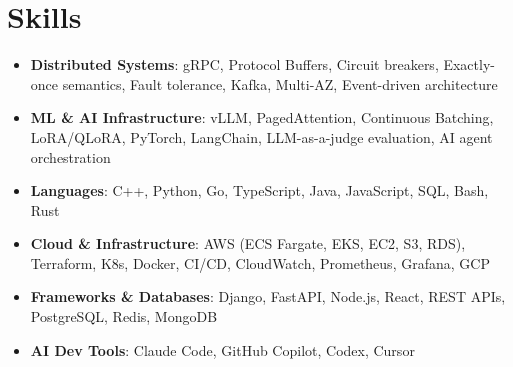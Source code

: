 \documentclass[letterpaper,11pt]{article}
\newcommand{\resumeSubHeadingListStart}{\begin{itemize}[leftmargin=0.15in, label={}]}
\newcommand{\resumeSubHeadingListEnd}{\end{itemize}}
\newcommand{\resumeSkillHeading}[2]{%
  \item\small{\textbf{#1}: #2 \vspace{-9pt}}%
}
\begin{document}
\section{Skills}
  \resumeSubHeadingListStart
    \resumeSkillHeading{Distributed Systems}{gRPC, Protocol Buffers, Circuit breakers, Exactly-once semantics, Fault tolerance, Kafka, Multi-AZ, Event-driven architecture}
    \resumeSkillHeading{ML \& AI Infrastructure}{vLLM, PagedAttention, Continuous Batching, LoRA/QLoRA, PyTorch, LangChain, LLM-as-a-judge evaluation, AI agent orchestration}
    \resumeSkillHeading{Languages}{C++, Python, Go, TypeScript, Java, JavaScript, SQL, Bash, Rust}
    \resumeSkillHeading{Cloud \& Infrastructure}{AWS (ECS Fargate, EKS, EC2, S3, RDS), Terraform, K8s, Docker, CI/CD, CloudWatch, Prometheus, Grafana, GCP}
    \resumeSkillHeading{Frameworks \& Databases}{Django, FastAPI, Node.js, React, REST APIs, PostgreSQL, Redis, MongoDB}
    \resumeSkillHeading{AI Dev Tools}{Claude Code, GitHub Copilot, Codex, Cursor}
  \resumeSubHeadingListEnd
\end{document}
